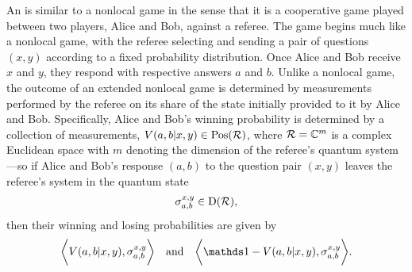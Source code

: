 An  is similar to a nonlocal game in the sense that it is a cooperative game played between two players, Alice and Bob, against a referee. The game begins much like a nonlocal game, with the referee selecting and sending a pair of questions $(x,y)$ according to a fixed probability distribution. Once Alice and Bob receive $x$ and $y$, they respond with respective answers $a$ and $b$. Unlike a nonlocal game, the outcome of an extended nonlocal game is determined by measurements performed by the referee on its share of the state initially provided to it by Alice and Bob. Specifically, Alice and Bob's winning probability is determined by a collection of measurements, $V(a,b|x,y) \in \mathrm{Pos}(\mathcal{R})$, where $\mathcal{R} = \mathbb{C}^m$ is a complex Euclidean space with $m$ denoting the dimension of the referee's quantum system---so if Alice and Bob's response $(a,b)$ to the question pair $(x,y)$ leaves the referee's system in the quantum state 
\begin{align}
	\sigma_{a,b}^{x,y} \in \mathrm{D}(\mathcal{R}),
\end{align}
then their winning and losing probabilities are given by 
\begin{align}
	\biggip{V(a,b|x,y)}{\sigma_{a,b}^{x,y}} \quad \textnormal{and} \quad \biggip{\I - V(a,b|x,y)}{\sigma_{a,b}^{x,y}}.
\end{align}


